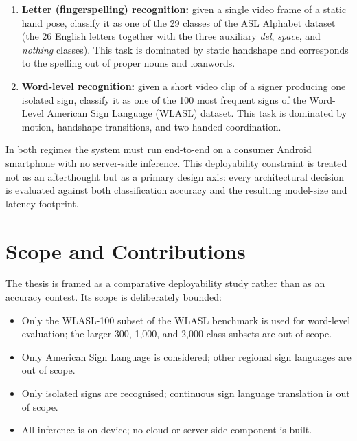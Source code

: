 \begin{enumerate}
  \item \textbf{Letter (fingerspelling) recognition:} given a single
        video frame of a static hand pose, classify it as one of the
        29 classes of the ASL Alphabet dataset (the 26 English
        letters together with the three auxiliary
        \emph{del}, \emph{space}, and \emph{nothing} classes). This
        task is dominated by static handshape and corresponds to the
        spelling out of proper nouns and loanwords.
  \item \textbf{Word-level recognition:} given a short video clip of
        a signer producing one isolated sign, classify it as one of
        the 100 most frequent signs of the Word-Level American Sign
        Language (WLASL) dataset. This task is dominated by motion,
        handshape transitions, and two-handed coordination.
\end{enumerate}

In both regimes the system must run end-to-end on a consumer Android
smartphone with no server-side inference. This deployability
constraint is treated not as an afterthought but as a primary design
axis: every architectural decision is evaluated against both
classification accuracy and the resulting model-size and latency
footprint.

\section{Scope and Contributions}
\label{sec:intro-scope}

The thesis is framed as a comparative deployability study rather than
as an accuracy contest. Its scope is deliberately bounded:

\begin{itemize}
  \item Only the WLASL-100 subset of the WLASL benchmark is used for
        word-level evaluation; the larger 300, 1{,}000, and 2{,}000
        class subsets are out of scope.
  \item Only American Sign Language is considered; other regional
        sign languages are out of scope.
  \item Only isolated signs are recognised; continuous sign language
        translation is out of scope.
  \item All inference is on-device; no cloud or server-side component
        is built.
\end{itemize}

